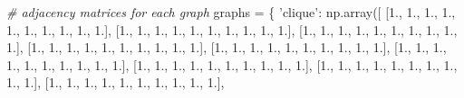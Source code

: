 \documentclass[11pt]{article}
\newenvironment{Shaded}{}{}
\newcommand{\DecValTok}[1]{\textcolor[rgb]{0.25,0.63,0.44}{{#1}}}
\newcommand{\StringTok}[1]{\textcolor[rgb]{0.25,0.44,0.63}{{#1}}}
\newcommand{\CommentTok}[1]{\textcolor[rgb]{0.38,0.63,0.69}{\textit{{#1}}}}
\newcommand{\NormalTok}[1]{{#1}}
\newcommand{\OperatorTok}[1]{\textcolor[rgb]{0.40,0.40,0.40}{{#1}}}
\begin{document}
\begin{Shaded}
\begin{Highlighting}[]
\CommentTok{# adjacency matrices for each graph}
\NormalTok{graphs }\OperatorTok{=}\NormalTok{ \{}
    \StringTok{'clique'}\NormalTok{: np.array([}
\NormalTok{        [}\DecValTok{1}\NormalTok{., }\DecValTok{1}\NormalTok{., }\DecValTok{1}\NormalTok{., }\DecValTok{1}\NormalTok{., }\DecValTok{1}\NormalTok{., }\DecValTok{1}\NormalTok{., }\DecValTok{1}\NormalTok{., }\DecValTok{1}\NormalTok{., }\DecValTok{1}\NormalTok{., }\DecValTok{1}\NormalTok{.],}
\NormalTok{        [}\DecValTok{1}\NormalTok{., }\DecValTok{1}\NormalTok{., }\DecValTok{1}\NormalTok{., }\DecValTok{1}\NormalTok{., }\DecValTok{1}\NormalTok{., }\DecValTok{1}\NormalTok{., }\DecValTok{1}\NormalTok{., }\DecValTok{1}\NormalTok{., }\DecValTok{1}\NormalTok{., }\DecValTok{1}\NormalTok{.],}
\NormalTok{        [}\DecValTok{1}\NormalTok{., }\DecValTok{1}\NormalTok{., }\DecValTok{1}\NormalTok{., }\DecValTok{1}\NormalTok{., }\DecValTok{1}\NormalTok{., }\DecValTok{1}\NormalTok{., }\DecValTok{1}\NormalTok{., }\DecValTok{1}\NormalTok{., }\DecValTok{1}\NormalTok{., }\DecValTok{1}\NormalTok{.],}
\NormalTok{        [}\DecValTok{1}\NormalTok{., }\DecValTok{1}\NormalTok{., }\DecValTok{1}\NormalTok{., }\DecValTok{1}\NormalTok{., }\DecValTok{1}\NormalTok{., }\DecValTok{1}\NormalTok{., }\DecValTok{1}\NormalTok{., }\DecValTok{1}\NormalTok{., }\DecValTok{1}\NormalTok{., }\DecValTok{1}\NormalTok{.],}
\NormalTok{        [}\DecValTok{1}\NormalTok{., }\DecValTok{1}\NormalTok{., }\DecValTok{1}\NormalTok{., }\DecValTok{1}\NormalTok{., }\DecValTok{1}\NormalTok{., }\DecValTok{1}\NormalTok{., }\DecValTok{1}\NormalTok{., }\DecValTok{1}\NormalTok{., }\DecValTok{1}\NormalTok{., }\DecValTok{1}\NormalTok{.],}
\NormalTok{        [}\DecValTok{1}\NormalTok{., }\DecValTok{1}\NormalTok{., }\DecValTok{1}\NormalTok{., }\DecValTok{1}\NormalTok{., }\DecValTok{1}\NormalTok{., }\DecValTok{1}\NormalTok{., }\DecValTok{1}\NormalTok{., }\DecValTok{1}\NormalTok{., }\DecValTok{1}\NormalTok{., }\DecValTok{1}\NormalTok{.],}
\NormalTok{        [}\DecValTok{1}\NormalTok{., }\DecValTok{1}\NormalTok{., }\DecValTok{1}\NormalTok{., }\DecValTok{1}\NormalTok{., }\DecValTok{1}\NormalTok{., }\DecValTok{1}\NormalTok{., }\DecValTok{1}\NormalTok{., }\DecValTok{1}\NormalTok{., }\DecValTok{1}\NormalTok{., }\DecValTok{1}\NormalTok{.],}
\NormalTok{        [}\DecValTok{1}\NormalTok{., }\DecValTok{1}\NormalTok{., }\DecValTok{1}\NormalTok{., }\DecValTok{1}\NormalTok{., }\DecValTok{1}\NormalTok{., }\DecValTok{1}\NormalTok{., }\DecValTok{1}\NormalTok{., }\DecValTok{1}\NormalTok{., }\DecValTok{1}\NormalTok{., }\DecValTok{1}\NormalTok{.],}
\NormalTok{        [}\DecValTok{1}\NormalTok{., }\DecValTok{1}\NormalTok{., }\DecValTok{1}\NormalTok{., }\DecValTok{1}\NormalTok{., }\DecValTok{1}\NormalTok{., }\DecValTok{1}\NormalTok{., }\DecValTok{1}\NormalTok{., }\DecValTok{1}\NormalTok{., }\DecValTok{1}\NormalTok{., }\DecValTok{1}\NormalTok{.],}

\end{Highlighting}
\end{Shaded}
\end{document}
